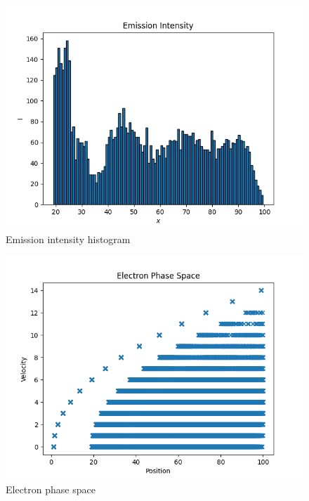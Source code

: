 \documentclass[11pt, a4paper]{article}
\begin{document}
\begin{figure}[!tbh]
\centering
\includegraphics[scale=0.75]{assn6_plot1.png} 
\caption{Emission intensity histogram}
\label{fig1}
\end{figure}

\begin{figure}[!tbh]
\centering
\includegraphics[scale=0.7]{assn6_plot2.png} 
\caption{Electron phase space}
\label{fig2}
\end{figure}
\end{document}
